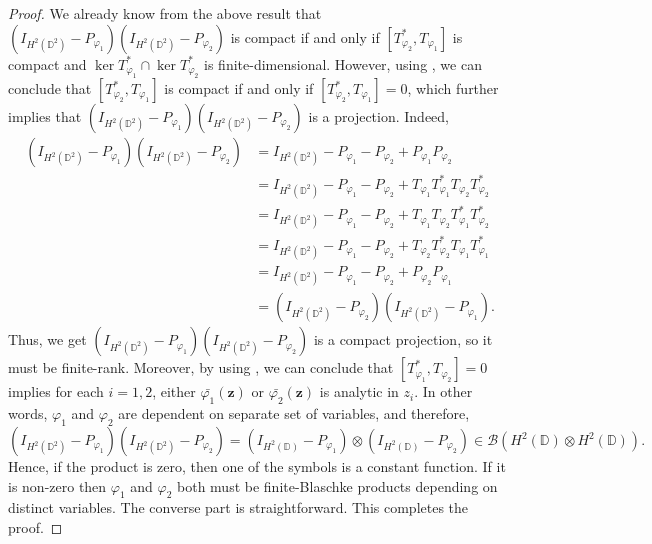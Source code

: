 \documentclass[12pt, a4 paper]{amsart}
\newcommand{\clb}{\mathcal{B}}
\newcommand{\D}{\mathbb{D}}
\theoremstyle{definition}
\theoremstyle{plain}
\theoremstyle{definition}
\numberwithin{equation}{section}
\let\phi=\varphi
\begin{document}
\begin{proof}
We already know from the above result that $(I_{H^2(\D^2)}  - P_{\phi_1})(I_{H^2(\D^2)}  - P_{\phi_2})$ is compact if and only if $[T_{\phi_2}^*, T_{\phi_1}]$ is compact and $\ker T_{\phi_1}^* \cap \ker T_{\phi_2}^*$ is finite-dimensional. However, using \cite[Corollary 2]{GuZ}, we can conclude that $[T_{\phi_2}^*, T_{\phi_1}]$ is compact if and only if $[T_{\phi_2}^*, T_{\phi_1}] = 0$, which further implies that $(I_{H^2(\D^2)}  - P_{\phi_1})(I_{H^2(\D^2)}  - P_{\phi_2})$ is a projection. Indeed,
\begin{align*}
(I_{H^2(\D^2)}  - P_{\phi_1})(I_{H^2(\D^2)}  - P_{\phi_2}) &= I_{H^2(\D^2)} - P_{\phi_1} - P_{\phi_2} + P_{\phi_1}P_{\phi_2} \\
&= I_{H^2(\D^2)} - P_{\phi_1} - P_{\phi_2} + T_{\phi_1}T_{\phi_1}^* T_{\phi_2}T_{\phi_2}^*\\
&= I_{H^2(\D^2)} - P_{\phi_1} - P_{\phi_2} + T_{\phi_1}T_{\phi_2}T_{\phi_1}^* T_{\phi_2}^*\\
&= I_{H^2(\D^2)} - P_{\phi_1} - P_{\phi_2} + T_{\phi_2} T_{\phi_2}^* T_{\phi_1}T_{\phi_1}^*\\
&= I_{H^2(\D^2)}  - P_{\phi_1} - P_{\phi_2} + P_{\phi_2}P_{\phi_1} \\
&=   (I_{H^2(\D^2)}  - P_{\phi_2})(I_{H^2(\D^2)}  - P_{\phi_1}).
\end{align*}
Thus, we get $(I_{H^2(\D^2)}  - P_{\phi_1})(I_{H^2(\D^2)}  - P_{\phi_2})$ is a compact projection, so it must be finite-rank. Moreover, by using \cite[Corollary 2]{Gu}, we can conclude that $[T_{\phi_1}^*, T_{\phi_2}] = 0$ implies for each $i=1,2$, either $\bar{\phi_1}(\bm{z})$ or $\bar{\phi_2}(\bm{z})$ is analytic in $z_i$. In other words, $\phi_1$ and $\phi_2$ are dependent on separate set of variables, and therefore,
\[
(I_{H^2(\D^2)}  - P_{\phi_1})(I_{H^2(\D^2)}  - P_{\phi_2}) = (I_{H^2(\D)} - P_{\phi_1}) \otimes (I_{H^2(\D)} - P_{\phi_2}) \in \clb(H^2(\D) \otimes H^2(\D)).
\]
Hence, if the product is zero, then one of the symbols is a constant function. If it is non-zero then $\phi_1$ and $\phi_2$ both must be finite-Blaschke products depending on distinct variables. The converse part is straightforward. This completes the proof.
\end{proof}
\end{document}
